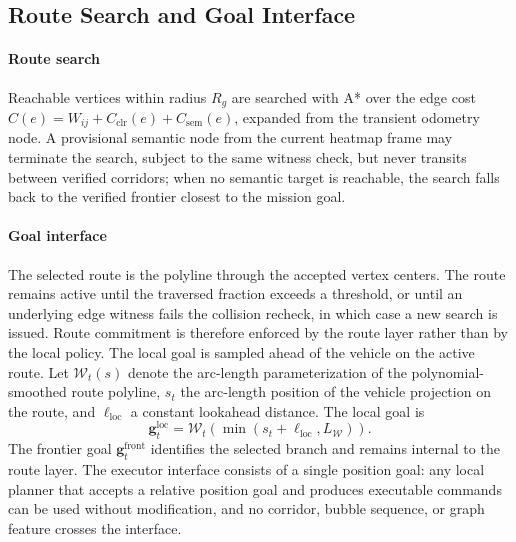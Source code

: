 \documentclass[letterpaper,10pt,conference]{ieeeconf}
\newcommand{\vect}[1]{\boldsymbol{#1}}
\begin{document}
\subsection{Route Search and Goal Interface}
\label{sec:interface}
\paragraph{Route search}
Reachable vertices within radius $R_g$ are searched with A* over the
edge cost $C(e)=W_{ij}+C_{\mathrm{clr}}(e)+C_{\mathrm{sem}}(e)$, expanded
from the transient odometry node.  A provisional semantic node from the
current heatmap frame may terminate the search, subject to the same
witness check, but never transits
between verified corridors; when no semantic target is reachable, the
search falls back to the verified frontier closest to the mission goal.

\paragraph{Goal interface}
The selected route is the polyline through the accepted vertex centers.
The route remains active until
the traversed fraction exceeds a threshold, or until an underlying
edge witness fails the collision recheck, in which case a new search is
issued.  Route commitment is therefore enforced by the route layer
rather than by the local policy.
The local goal is sampled ahead of the vehicle on the active route.  Let
$\mathcal{W}_t(s)$ denote the arc-length parameterization of the
polynomial-smoothed route polyline, $s_t$ the arc-length position of the
vehicle projection on the route, and $\ell_{\mathrm{loc}}$ a constant
lookahead distance.  The local goal is
\begin{equation}
 \vect{g}^{\mathrm{loc}}_t=
 \mathcal{W}_t\!\left(\min(s_t+\ell_{\mathrm{loc}},L_{\mathcal W})\right).
\label{eq:local_goal}
\end{equation}
The frontier goal $\vect{g}^{\mathrm{front}}_t$ identifies the selected
branch and remains internal to the route layer.  The executor interface
consists of a single position goal: any local planner that accepts a
relative position goal and produces executable commands can be used
without modification, and no corridor, bubble sequence, or graph feature
crosses the interface.

\end{document}
